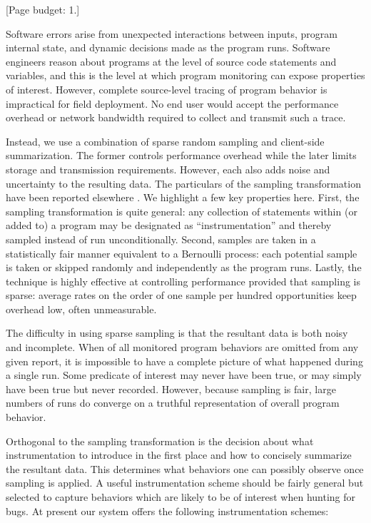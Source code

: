 \documentclass{sig-alternate}
\newcommand{\placeholder}[1]{{\color[cmyk]{0,0.61,0.87,0}[#1]}}
\begin{document}
\placeholder{Page budget: 1.}

Software errors arise from unexpected interactions between inputs,
program internal state, and dynamic decisions made as the program
runs.  Software engineers reason about programs at the level of source
code statements and variables, and this is the level at which program
monitoring can expose properties of interest.  However, complete
source-level tracing of program behavior is impractical for field
deployment.  No end user would accept the performance overhead or
network bandwidth required to collect and transmit such a trace.

Instead, we use a combination of sparse random sampling and
client-side summarization.  The former controls performance overhead
while the later limits storage and transmission requirements.
However, each also adds noise and uncertainty to the resulting data.
The particulars of the sampling transformation have been reported
elsewhere \cite{PLDI`03*141}.  We highlight a few key properties here.
First, the sampling transformation is quite general: any collection of
statements within (or added to) a program may be designated as
``instrumentation'' and thereby sampled instead of run
unconditionally.  Second, samples are taken in a statistically fair
manner equivalent to a Bernoulli process: each potential sample is
taken or skipped randomly and independently as the program runs.
Lastly, the technique is highly effective at controlling performance
provided that sampling is sparse: average rates on the order of one
sample per hundred opportunities keep overhead low, often
unmeasurable.

The difficulty in using sparse sampling is that the resultant data is
both noisy and incomplete.  When  of all monitored
program behaviors are omitted from any given report, it is impossible
to have a complete picture of what happened during a single run.  Some
predicate of interest may never have been true, or may simply have
been true but never recorded.  However, because sampling is fair,
large numbers of runs do converge on a truthful representation of
overall program behavior.

Orthogonal to the sampling transformation is the decision about what
instrumentation to introduce in the first place and how to concisely
summarize the resultant data.  This determines what behaviors one can
possibly observe once sampling is applied.  A useful instrumentation
scheme should be fairly general but selected to capture behaviors
which are likely to be of interest when hunting for bugs.  At present
our system offers the following instrumentation schemes:
\end{document}
